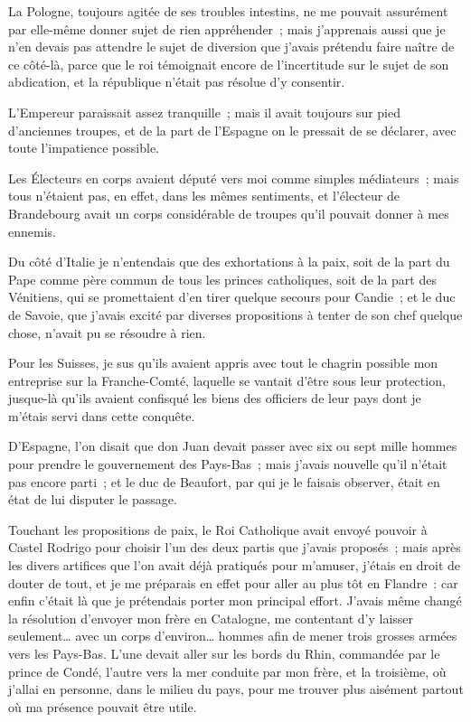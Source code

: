 \documentclass[french,twoside]{book} %
\begin{document}
La Pologne, toujours agitée de ses troubles intestins, ne me pouvait assurément par elle-même donner sujet de rien appréhender ; mais j’apprenais aussi que je n’en devais pas attendre le sujet de diversion que j’avais prétendu faire naître de ce côté-là, parce que le roi témoignait encore de l’incertitude sur le sujet de son abdication, et la république n’était pas résolue d’y consentir.\par
L’Empereur paraissait assez tranquille ; mais il avait toujours sur pied d’anciennes troupes, et de la part de l’Espagne on le pressait de se déclarer, avec toute l’impatience possible.\par
Les Électeurs en corps avaient député vers moi comme simples médiateurs ; mais tous n’étaient pas, en effet, dans les mêmes sentiments, et l’électeur de Brandebourg avait un corps considérable de troupes qu’il pouvait donner à mes ennemis.\par
Du côté d’Italie je n’entendais que des exhortations à la paix, soit de la part du Pape comme père commun de tous les princes catholiques, soit de la part des Vénitiens, qui se promettaient d’en tirer quelque secours pour Candie ; et le duc de Savoie, que j’avais excité par diverses propositions à tenter de son chef quelque chose, n’avait pu se résoudre à rien.\par
Pour les Suisses, je sus qu’ils avaient appris avec tout le chagrin possible mon entreprise sur la Franche-Comté, laquelle se vantait d’être sous leur protection, jusque-là qu’ils avaient confisqué les biens des officiers de leur pays dont je m’étais servi dans cette conquête.\par
D’Espagne, l’on disait que don Juan devait passer avec six ou sept mille hommes pour prendre le gouvernement des Pays-Bas ; mais j’avais nouvelle qu’il n’était pas encore parti ; et le duc de Beaufort, par qui je le faisais observer, était en état de lui disputer le passage.\par
Touchant les propositions de paix, le Roi Catholique avait envoyé pouvoir à Castel Rodrigo pour choisir l’un des deux partis que j’avais proposés ; mais après les divers artifices que l’on avait déjà pratiqués pour m’amuser, j’étais en droit de douter de tout, et je me préparais en effet pour aller au plus tôt en Flandre : car enfin c’était là que je prétendais porter mon principal effort. J’avais même changé la résolution d’envoyer mon frère en Catalogne, me contentant d’y laisser seulement… avec un corps d’environ… hommes afin de mener trois grosses armées vers les Pays-Bas. L’une devait aller sur les bords du Rhin, commandée par le prince de Condé, l’autre vers la mer conduite par mon frère, et la troisième, où j’allai en personne, dans le milieu du pays, pour me trouver plus aisément partout où ma présence pouvait être utile.\par
\end{document}
